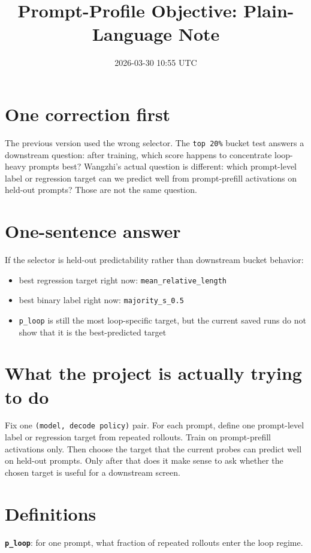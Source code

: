 \documentclass[11pt]{article}
\title{Prompt-Profile Objective: Plain-Language Note}
\author{}
\date{2026-03-30 10:55 UTC}
\begin{document}
\maketitle

\section*{One correction first}
The previous version used the wrong selector. The \texttt{top 20\%} bucket test
answers a downstream question: after training, which score happens to
concentrate loop-heavy prompts best? Wangzhi's actual question is different:
which prompt-level label or regression target can we predict well from
prompt-prefill activations on held-out prompts? Those are not the same
question.

\section*{One-sentence answer}
If the selector is held-out predictability rather than downstream bucket
behavior:
\begin{itemize}[leftmargin=1.5em]
\item best regression target right now: \texttt{mean\_relative\_length}
\item best binary label right now: \texttt{majority\_s\_0.5}
\item \texttt{p\_loop} is still the most loop-specific target, but the current
saved runs do not show that it is the best-predicted target
\end{itemize}

\section*{What the project is actually trying to do}
Fix one \texttt{(model, decode policy)} pair. For each prompt, define one
prompt-level label or regression target from repeated rollouts. Train on
prompt-prefill activations only. Then choose the target that the current probes
can predict well on held-out prompts. Only after that does it make sense to ask
whether the chosen target is useful for a downstream screen.

\section*{Definitions}
\textbf{\texttt{p\_loop}}: for one prompt, what fraction of repeated rollouts
enter the loop regime.
\end{document}
